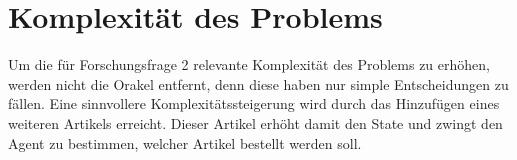 \section{Komplexität des Problems}
Um die für Forschungsfrage 2 relevante Komplexität des Problems zu erhöhen, werden nicht die Orakel entfernt, denn diese haben nur simple Entscheidungen zu fällen. Eine sinnvollere Komplexitätssteigerung wird durch das Hinzufügen eines weiteren Artikels erreicht. Dieser Artikel erhöht damit den State und zwingt den Agent zu bestimmen, welcher Artikel bestellt werden soll.